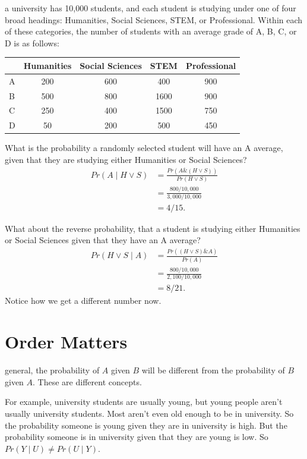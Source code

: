 \documentclass[justified]{tufte-book}
\newcommand{\given}{\mid}
\renewcommand{\wedge}{\mathbin{\&}}
\newcommand{\p}{Pr}
\theoremstyle{definition}
\theoremstyle{definition}
\theoremstyle{definition}
\theoremstyle{remark}
\begin{document}
 a university has 10,000 students, and each student
is studying under one of four broad headings: Humanities, Social
Sciences, STEM, or Professional. Within each of these categories, the
number of students with an average grade of A, B, C, or D is as follows:

\begin{longtable}[]{@{}lcccc@{}}
\toprule
& Humanities & Social Sciences & STEM & Professional\tabularnewline
\midrule
\endhead
A & 200 & 600 & 400 & 900\tabularnewline
B & 500 & 800 & 1600 & 900\tabularnewline
C & 250 & 400 & 1500 & 750\tabularnewline
D & 50 & 200 & 500 & 450\tabularnewline
\bottomrule
\end{longtable}

What is the probability a randomly selected student will have an A
average, given that they are studying either Humanities or Social
Sciences? \[
  \begin{aligned}
    \p(A \given H \vee S) &= \frac{\p(A \wedge (H \vee S))}{\p(H \vee S)}\\
                           &= \frac{800/10,000}{3,000/10,000}\\
                           &= 4/15.
  \end{aligned}
\]

What about the reverse probability, that a student is studying either
Humanities or Social Sciences given that they have an A average? \[
  \begin{aligned}
    \p(H \vee S \given A) &= \frac{\p((H \vee S) \wedge A)}{\p(A)}\\
                           &= \frac{800/10,000}{2,100/10,000}\\
                           &= 8/21.
  \end{aligned}
\] Notice how we get a different number now.

\hypertarget{order-matters}{%
\section{Order Matters}\label{order-matters}}

 general, the probability of \(A\) given \(B\) will be
different from the probability of \(B\) given \(A\). These are different
concepts.

For example, university students are usually young, but young people
aren't usually university students. Most aren't even old enough to be in
university. So the probability someone is young given they are in
university is high. But the probability someone is in university given
that they are young is low. So \(\p(Y \given U) \neq \p(U \given Y)\).
\end{document}
